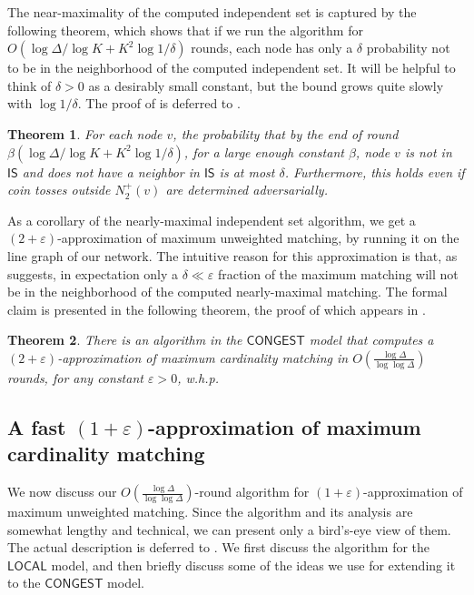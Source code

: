 \documentclass[11pt]{article}
\newtheorem{theorem}{Theorem}[section]
\newcommand{\eps}{\varepsilon}
\begin{document}
The near-maximality of the computed independent set is captured by the following theorem, which shows that if we run the algorithm for $O(\log \Delta/\log K + K^2 \log 1/\delta)$ rounds, each node has only a $\delta$ probability not to be in the neighborhood of the computed independent set. It will be helpful to think of $\delta>0$ as a desirably small constant, but the bound grows quite slowly with $\log 1/\delta$. The proof of  is deferred to . 
\begin{theorem} \label{thm:local-restate} For each node $v$, the probability that by the end of round $\beta(\log \Delta/\log K + K^2 \log 1/\delta)$, for a large enough constant $\beta$, node $v$ is not in $\mathsf{IS}$ and does not have a neighbor in $\mathsf{IS}$ is at most $\delta$. Furthermore, this holds even if coin tosses outside $N^{+}_{2}(v)$ are determined adversarially.
\end{theorem}
As a corollary of the nearly-maximal independent set algorithm, we get a $(2+\eps)$-approximation of maximum unweighted matching, by running it on the line graph of our network. The intuitive reason for this approximation is that, as  suggests, in expectation only a $\delta\ll \eps$ fraction of the maximum matching will not be in the neighborhood of the computed nearly-maximal matching. The formal claim is presented in the following theorem, the proof of which appears in .
\begin{theorem} \label{thm:MCM2CONGEST} There is an algorithm in the $\mathsf{CONGEST}$ model that computes a $(2+\eps)$-approximation of maximum cardinality matching in $O(\frac{\log\Delta} {\log\log \Delta})$ rounds, for any constant $\eps>0$, w.h.p.
\end{theorem}

\subsection{A fast $(1+\eps)$-approximation of maximum cardinality matching}
We now discuss our $O(\frac{\log \Delta}{\log\log \Delta})$-round algorithm for $(1+\eps)$-approximation of maximum unweighted matching. Since the algorithm and its analysis are somewhat lengthy and technical, we can present only a bird's-eye view of them. The actual description is deferred to . We first discuss the algorithm for the $\mathsf{LOCAL}$ model, and then briefly discuss some of the ideas we use for extending it to the $\mathsf{CONGEST}$ model.
\end{document}
